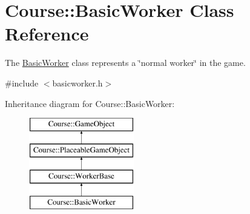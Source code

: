 \hypertarget{classCourse_1_1BasicWorker}{\section{Course\-:\-:Basic\-Worker Class Reference}
\label{classCourse_1_1BasicWorker}
}


The \hyperlink{classCourse_1_1BasicWorker}{Basic\-Worker} class represents a \char`\"{}normal worker\char`\"{} in the game.  




{\ttfamily \#include $<$basicworker.\-h$>$}

Inheritance diagram for Course\-:\-:Basic\-Worker\-:\begin{figure}[H]
\begin{center}
\leavevmode
\includegraphics[height=4.000000cm]{classCourse_1_1BasicWorker}
\end{center}
\end{figure}
